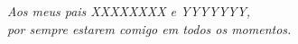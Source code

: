 \begin{dedicatoria}
   \vspace*{\fill}
   \centering
   \noindent
   \textit{ Aos meus pais XXXXXXXX e YYYYYYY, \\ por sempre estarem comigo em todos os momentos.} \vspace*{\fill}
\end{dedicatoria}
